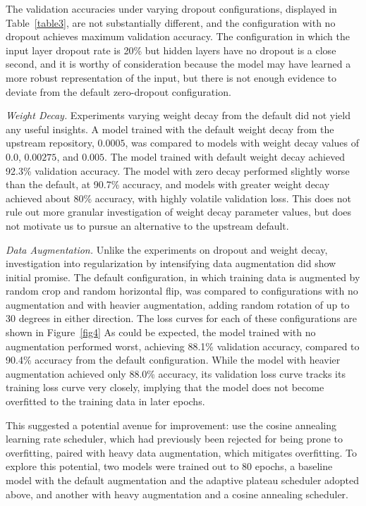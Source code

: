 \documentclass[letterpaper]{article} %
\begin{document}
The validation accuracies under varying dropout configurations, displayed in Table~\ref{table3},
are not substantially different, and the configuration with no dropout achieves maximum validation accuracy.
The configuration in which the input layer dropout rate is 20\% but hidden layers have no dropout
is a close second, and it is worthy of consideration because the model may have learned a more robust
representation of the input, but there is not enough evidence to deviate from the default zero-dropout
configuration.

\textit{Weight Decay.}
Experiments varying weight decay from the default did not yield any useful insights.
A model trained with the default weight decay from the upstream repository, $0.0005 $,
was compared to models with weight decay values of $ 0.0 $, $ 0.00275 $, and $ 0.005 $.
The model trained with default weight decay achieved 92.3\% validation accuracy.
The model with zero decay performed slightly worse than the default, at 90.7\% accuracy, and
models with greater weight decay achieved about 80\% accuracy, with highly volatile validation
loss.
This does not rule out more granular investigation of weight decay parameter values, but does not
motivate us to pursue an alternative to the upstream default.

\textit{Data Augmentation.}
Unlike the experiments on dropout and weight decay, investigation into regularization by
intensifying data augmentation did show initial promise.
The default configuration, in which training data is augmented by random crop and random horizontal flip,
was compared to configurations with no augmentation and with heavier augmentation,
adding random rotation of up to 30 degrees in either direction.
The loss curves for each of these configurations are shown in Figure~\ref{fig4}
As could be expected, the model trained with no augmentation performed worst,
achieving 88.1\% validation accuracy, compared to 90.4\% accuracy from the default configuration.
While the model with heavier augmentation achieved only 88.0\% accuracy, its
validation loss curve tracks its training loss curve very closely, implying that
the model does not become overfitted to the training data in later epochs.

This suggested a potential avenue for improvement: use the cosine annealing learning rate scheduler,
which had previously been rejected for being prone to overfitting, paired with heavy
data augmentation, which mitigates overfitting.
To explore this potential, two models were trained out to 80 epochs, a baseline model with the
default augmentation and the adaptive plateau scheduler adopted above, and another with
heavy augmentation and a cosine annealing scheduler.
\end{document}
